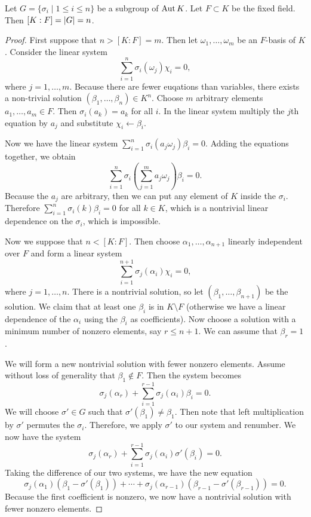 \documentclass[10pt, twoside]{article}
\begin{document}
    \begin{thm}
        Let $G = \{\sigma_i \mid 1 \leq i \leq n\}$ be a subgroup of $\operatorname{Aut}{K}$. Let $F \subset K$ be the fixed field. Then $[K:F] = \lvert G\rvert = n$.
        \begin{proof}
            First suppose that $n > [K:F] = m$. Then let $\omega_1, \ldots, \omega_m$ be an $F$-basis of $K$. Consider the linear system \[\sum_{i=1}^n \sigma_i(\omega_j) \chi_i = 0,\] where $j = 1, \ldots, m$. Because there are fewer euqations than variables, there exists a non-trivial solution $(\beta_1, \ldots, \beta_n) \in K^n$. Choose $m$ arbitrary elements $a_1, \ldots, a_m \in F$. Then $\sigma_i(a_k) = a_k$ for all $i$. In the linear system multiply the $j$th equation by $a_j$ and substitute $\chi_i \gets \beta_i$.

            Now we have the linear system $\sum_{i=1}^n \sigma_i(a_j \omega_j) \beta_i = 0$. Adding the equations together, we obtain \[\sum_{i=1}^n \sigma_i \left(\sum_{j=1}^m a_j \omega_j \right) \beta_i = 0.\] Because the $a_j$ are arbitrary, then we can put any element of $K$ inside the $\sigma_i$. Therefore $\sum_{i=1}^n \sigma_i(k) \beta_i = 0$ for all $k \in K$, which is a nontrivial linear dependence on the $\sigma_i$, which is impossible.

            Now we suppose that $n < [K:F]$. Then choose $\alpha_1, \ldots, \alpha_{n+1}$ linearly independent over $F$ and form a linear system \[\sum_{i=1}^{n+1} \sigma_j(\alpha_i) \chi_i = 0,\] where $j = 1, \ldots, n$. There is a nontrivial solution, so let $(\beta_1, \ldots, \beta_{n+1})$ be the solution. We claim that at least one $\beta_i$ is in $K\setminus F$ (otherwise we have a linear dependence of the $\alpha_i$ using the $\beta_i$ as coefficients).  Now choose a solution with a minimum number of nonzero elements, say $r \leq n+1$. We can assume that $\beta_r = 1$.

            We will form a new nontrivial solution with fewer nonzero elements. Assume without loss of generality that $\beta_1 \not\in F$. Then the system becomes \[\sigma_j(\alpha_r) + \sum_{i=1}^{r-1} \sigma_j(\alpha_i) \beta_i = 0.\] We will choose $\sigma' \in G$ such that $\sigma'(\beta_1) \neq \beta_1$. Then note that left multiplication by $\sigma'$ permutes the $\sigma_i$. Therefore, we apply $\sigma'$ to our system and renumber. We now have the system \[\sigma_j(\alpha_r) + \sum_{i=1}^{r-1} \sigma_j(\alpha_i) \sigma'(\beta_i) = 0.\] Taking the difference of our two systems, we have the new equation \[\sigma_j(\alpha_1)(\beta_1 - \sigma'(\beta_1)) + \cdots + \sigma_j(\alpha_{r-1})(\beta_{r-1} - \sigma'(\beta_{r-1})) = 0.\] Because the first coefficient is nonzero, we now have a nontrivial solution with fewer nonzero elements.
        \end{proof}
    \end{thm}
\end{document}
